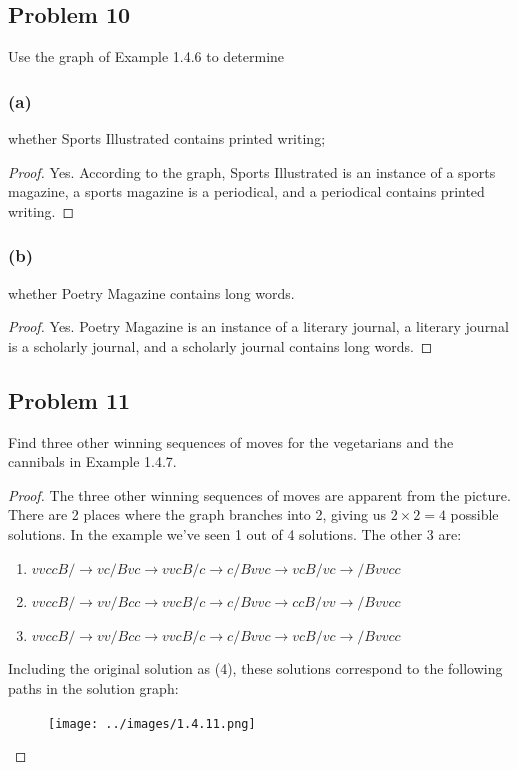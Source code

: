 \documentclass[14pt]{extarticle}
\begin{document}
\subsection{Problem 10}
Use the graph of Example 1.4.6 to determine

\subsubsection{(a)}
whether Sports Illustrated contains printed writing;

\begin{proof}
    Yes. According to the graph, Sports Illustrated is an instance of a sports
    magazine, a sports magazine is a periodical, and a periodical contains printed
    writing.
\end{proof}

\subsubsection{(b)}
whether Poetry Magazine contains long words.

\begin{proof}
    Yes. Poetry Magazine is an instance of a literary journal, a literary journal is
    a scholarly journal, and a scholarly journal contains long words.
\end{proof}

\subsection{Problem 11}
Find three other winning sequences of moves for the vegetarians and the
cannibals in Example 1.4.7.

\begin{proof}
    The three other winning sequences of moves are apparent from the picture.
    There are 2 places where the graph branches into 2, giving us $2 \times 2 = 4$
    possible solutions. In the example we've seen 1 out of 4 solutions. The other 3
    are:
    \begin{enumerate}
        \item $vvccB/ \to vc/Bvc \to vvcB/c \to c/Bvvc \to vcB/vc \to /Bvvcc$
        \item $vvccB/ \to vv/Bcc \to vvcB/c \to c/Bvvc \to ccB/vv \to /Bvvcc$
        \item $vvccB/ \to vv/Bcc \to vvcB/c \to c/Bvvc \to vcB/vc \to /Bvvcc$
    \end{enumerate}

    Including the original solution as (4), these solutions correspond to the
    following paths in the solution graph:

    \begin{figure}[ht!]
        \centering
        \texttt{[image: ../images/1.4.11.png]}
    \end{figure}
\end{proof}
\end{document}
